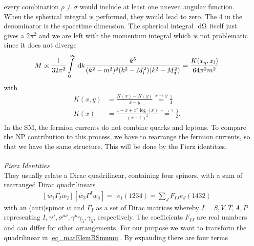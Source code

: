 every combination $\rho\neq\sigma$ would include at least one uneven angular function. When the spherical integral is performed, they would lead to zero. The 
4 in the denominator is the spacetime dimension. The spherical integral $\; \mathrm{d} \Omega$ itself just gives a $2\pi^2$ and we are left with the momentum integral
which is not problematic since it does not diverge
\begin{align}
 M \propto \frac{1}{32\pi^2} \int\limits_0^\infty \; \mathrm{d} k \frac{k^5}{(k^2-m^2)^2(k^2-M_l^2)(k^2-M_q^2)} = \frac{K(x_q,x_l)}{64\pi^2 m^2}
\end{align}
with
\begin{align}
 K(x,y) &= \frac{K(x)-K(y)}{x-y} \stackrel{x\rightarrow y}{=} \frac13\\
 K(x)&=\frac{1-x+x^2\log(x)}{(x-1)^2} \stackrel{x\rightarrow 1}{=} \frac32.
\end{align}
In the SM, the fermion currents do not combine quarks and leptons. To compare the NP contribution to this process, we have to rearrange the fermion currents,
so that we have the same structure. This will be done by the Fierz identities.
\\ \\ \noindent \textit{Fierz Identities}\\
They usually relate a Dirac quadrilinear, containing four spinors, with a sum of rearranged Dirac quadrilinears \cite{Fierz}
\begin{align}
  \left[\bar w_1\Gamma_I^{} w_2\right] \left[\bar w_3 \Gamma^I w_4 \right] =: e_I(1234) = \sum\limits_J F_{IJ} e_J(1432)
\end{align}
with an (anti)spinor $w$ and $\Gamma_I$ as a set of Dirac matrices whereby $I=S,V,T,A,P$ representing $I,\gamma^\mu,\sigma^{\mu\nu},\gamma^\mu\gamma_5,\gamma_5$, 
respectively. The coefficients $F_{IJ}$ are real numbers and can differ for other arrangements.
\noindent For our purpose we want to transform the quadrilinear in \eqref{eq_matElemBSmumu}. By expanding there are four terms
